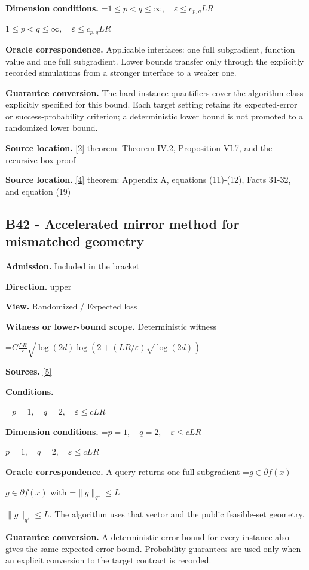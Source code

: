\documentclass[10pt,a4paper]{article}
\newcommand{\AtlasMath}[1]{\par\begingroup\centering\setbox0=\hbox{$\displaystyle #1$}\ifdim\wd0>1.4\linewidth\typeout{ATLAS WIDE FORMULA: \the\wd0}\fi\ifdim\wd0>\linewidth\resizebox{\linewidth}{!}{\box0}\else\box0\fi\par\endgroup}
\newcommand{\AtlasInlineMath}[1]{\begingroup\setbox0=\hbox{$#1$}\ifdim\wd0>.4\linewidth\endgroup\AtlasMath{#1}\else\endgroup$#1$\fi}
\begin{document}
\textbf{Dimension conditions.} \AtlasInlineMath{1\le p<q\le\infty,\quad\varepsilon\le c_{p,q}LR}

\textbf{Oracle correspondence.} Applicable interfaces: one full subgradient, function value and one full subgradient. Lower bounds transfer only through the explicitly recorded simulations from a stronger interface to a weaker one.

\textbf{Guarantee conversion.} The hard-instance quantifiers cover the algorithm class explicitly specified for this bound. Each target setting retains its expected-error or success-probability criterion; a deterministic lower bound is not promoted to a randomized lower bound.

\textbf{Source location.} \href{https://arxiv.org/pdf/1407.5144}{[2]} theorem: Theorem IV.2, Proposition VI.7, and the recursive-box proof

\textbf{Source location.} \href{https://arxiv.org/pdf/2609.20687}{[4]} theorem: Appendix A, equations (11)-(12), Facts 31-32, and equation (19)

\subsection{B42 - Accelerated mirror method for mismatched geometry}
\textbf{Admission.} Included in the bracket

\textbf{Direction.} upper

\textbf{View.} Randomized / Expected loss

\textbf{Witness or lower-bound scope.} Deterministic witness

\AtlasMath{C\frac{LR}{\varepsilon}\sqrt{\log(2d)\log(2+(LR/\varepsilon)\sqrt{\log(2d)})}}
\textbf{Sources.} \href{https://arxiv.org/pdf/2609.32910}{[5]}

\textbf{Conditions.} 
\AtlasMath{p=1,\quad q=2,\quad\varepsilon\le cLR}


\textbf{Dimension conditions.} \AtlasInlineMath{p=1,\quad q=2,\quad\varepsilon\le cLR}

\textbf{Oracle correspondence.} A query returns one full subgradient \AtlasInlineMath{g\in\partial f(x)} with \AtlasInlineMath{\|g\|_{q^\star}\le L}. The algorithm uses that vector and the public feasible-set geometry.

\textbf{Guarantee conversion.} A deterministic error bound for every instance also gives the same expected-error bound. Probability guarantees are used only when an explicit conversion to the target contract is recorded.
\end{document}
